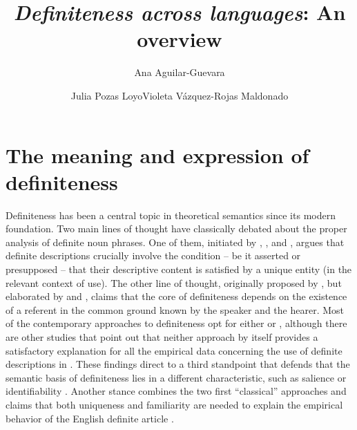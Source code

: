 \documentclass[output=paper]{langsci/langscibook}
\title{\texorpdfstring{\textit{Definiteness across languages}: An overview}{Definiteness across languages: An overview}}
\author{Ana Aguilar-Guevara\affiliation{Universidad Nacional Autónoma de México}\and Julia {Pozas Loyo}\affiliation{El Colegio de México}\lastand Violeta {Vázquez-Rojas Maldonado}\affiliation{El Colegio de México}}
\begin{document}
\abstract{\noabstract}
\maketitle

\section{The meaning and expression of definiteness}

Definiteness has been a central topic in theoretical semantics since its modern foundation. Two main lines of thought have classically debated about the proper analysis of definite noun phrases. One of them, initiated by \citet{Frege1892}, \citet{Russell1905}, and \citet{Strawson1950}, argues that definite descriptions crucially involve the condition -- be it asserted or presupposed -- that their descriptive content is satisfied by a unique entity (in the relevant context of use). The other line of thought, originally proposed by \citet{Christophersen1939}, but elaborated by \citet{Heim1982} and \citet{Kamp1981}, claims that the core of definiteness depends on the existence of a referent in the common ground known by the speaker and the hearer. Most of the contemporary approaches to definiteness opt for either  \citep[e.g.][]{Hawkins1978,Kadmon1990,Hawkins1991,Abbott1999} or  \citep[e.g.][]{Green1996,Chafe1996}, although there are other studies that point out that neither approach by itself provides a satisfactory explanation for all the empirical data concerning the use of definite descriptions in  \citep[e.g.][]{BirnerWard1994}. These findings direct to a third standpoint that defends that the semantic basis of definiteness lies in a different characteristic, such as salience \citep{Lewis1979} or identifiability \citep{BirnerWard1994}. Another stance combines the two first “classical” approaches and claims that both uniqueness and familiarity are needed to explain the empirical behavior of the English definite article \citep{Farkas2002,Roberts2003}.
\end{document}
